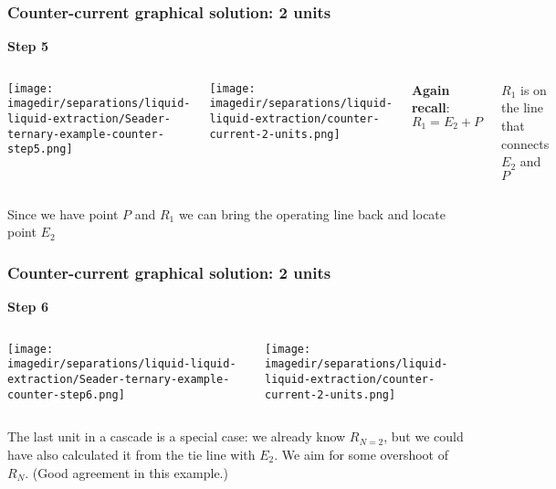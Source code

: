 \begin{frame}\frametitle{Counter-current graphical solution: 2 units}
	\textbf{Step 5}
	\begin{columns}[t]
			\begin{center}
				\texttt{[image: \\imagedir/separations/liquid-liquid-extraction/Seader-ternary-example-counter-step5.png]}
			\end{center}
			\begin{center}
				\texttt{[image: \\imagedir/separations/liquid-liquid-extraction/counter-current-2-units.png]}
			\end{center}
			\textbf{Again recall}:
			\vspace{-12pt}
			\[ R_1 = E_2 + P\]

			\vspace{-12pt}
			{\color{myOrange}\tiny$R_1$ is on the line that connects $E_2$ and $P$}
	\end{columns}
	\vspace{12pt}
	Since we have point $P$ and $R_1$ we can bring the operating line back and locate point $E_2$
	\vfill
\end{frame}

\begin{frame}\frametitle{Counter-current graphical solution: 2 units}
	\textbf{Step 6}
	\begin{columns}[t]
			\begin{center}
				\texttt{[image: \\imagedir/separations/liquid-liquid-extraction/Seader-ternary-example-counter-step6.png]}
			\end{center}
			\begin{center}
				\texttt{[image: \\imagedir/separations/liquid-liquid-extraction/counter-current-2-units.png]}
			\end{center}
	\end{columns}
	The last unit in a cascade is a special case: we already know $R_{N=2}$, but we could have also calculated it from the tie line with $E_2$. We aim for some overshoot of $R_N$. {\scriptsize (Good agreement in this example.)}
\end{frame}

